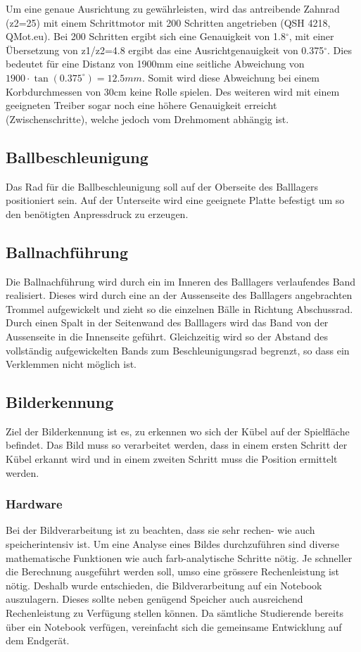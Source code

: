 Um eine genaue Ausrichtung zu gewährleisten, wird das antreibende Zahnrad 
(z2=25) mit einem Schrittmotor mit 200 Schritten angetrieben (QSH 4218, 
QMot.eu). Bei 200 Schritten ergibt sich eine Genauigkeit von 1.8$^\circ$, mit einer 
Übersetzung von z1/z2=4.8 ergibt das eine Ausrichtgenauigkeit von 0.375$^\circ$. Dies 
bedeutet für eine Distanz von 1900mm eine seitliche Abweichung von 
$1900 \cdot \tan(0.375^\circ)= 12.5mm$. Somit wird diese Abweichung bei einem 
Korbdurchmessen von 30cm keine Rolle spielen. Des weiteren wird mit einem 
geeigneten Treiber sogar noch eine höhere Genauigkeit erreicht 
(Zwischenschritte), welche jedoch vom Drehmoment abhängig ist. 

\subsection{Ballbeschleunigung}
Das Rad für die Ballbeschleunigung soll auf der Oberseite des Balllagers 
positioniert sein. Auf der Unterseite wird eine geeignete Platte befestigt um 
so den benötigten Anpressdruck zu erzeugen. 

\subsection{Ballnachführung}
Die Ballnachführung wird durch ein im Inneren des Balllagers verlaufendes Band 
realisiert. Dieses wird durch eine an der Aussenseite des Balllagers 
angebrachten Trommel aufgewickelt und zieht so die einzelnen Bälle in Richtung 
Abschussrad. Durch einen Spalt in der Seitenwand des Balllagers wird das Band 
von der Aussenseite in die Innenseite geführt. Gleichzeitig wird so der 
Abstand des vollständig aufgewickelten Bands zum Beschleunigungsrad begrenzt, 
so dass ein Verklemmen nicht möglich ist.

\subsection{Bilderkennung}
Ziel der Bilderkennung ist es, zu erkennen wo sich der Kübel auf der Spielfläche befindet. Das Bild muss so verarbeitet werden, dass in einem ersten Schritt der Kübel erkannt wird und in einem zweiten Schritt muss die Position ermittelt werden.
\subsubsection{Hardware}
Bei der Bildverarbeitung ist zu beachten, dass sie sehr rechen- wie auch speicherintensiv ist. Um eine Analyse eines Bildes durchzuführen sind diverse mathematische Funktionen wie auch farb-analytische Schritte nötig. Je schneller die Berechnung ausgeführt werden soll, umso eine grössere Rechenleistung ist nötig. Deshalb wurde entschieden, die Bildverarbeitung auf ein Notebook auszulagern. Dieses sollte neben genügend Speicher auch ausreichend Rechenleistung zu Verfügung stellen können. Da sämtliche Studierende bereits über ein Notebook verfügen, vereinfacht sich die gemeinsame Entwicklung auf dem Endgerät.

